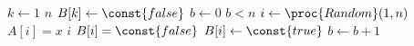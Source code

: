 \subsection{} %

\subsection{} %
\subsection{} %
\subsection{} %
\subsection{} %
\subsection{} %
\subsection{} %

\problems

\subsection{} %

\subsubsection{} %
\subsubsection{} %

\subsection{} %

\subsubsection{} %
\begin{codebox}
\li	\For $k\gets 1$ \To $n$
\li	 \Do
			$B[k]\gets\const{false}$
		\End
\li	$b\gets 0$
\li	\While $b<n$
\li		\Do
			$i\gets\proc{Random}(1,n)$
\li			\If $A[i]=x$
\li				\Then
					\Return $i$
\li				\ElseIf $B[i]=\const{false}$
\li					\Then
						$B[i]\gets\const{true}$
\li						$b\gets b+1$
					\End
				\End
		\End
\li	\Return {}
\end{codebox}

